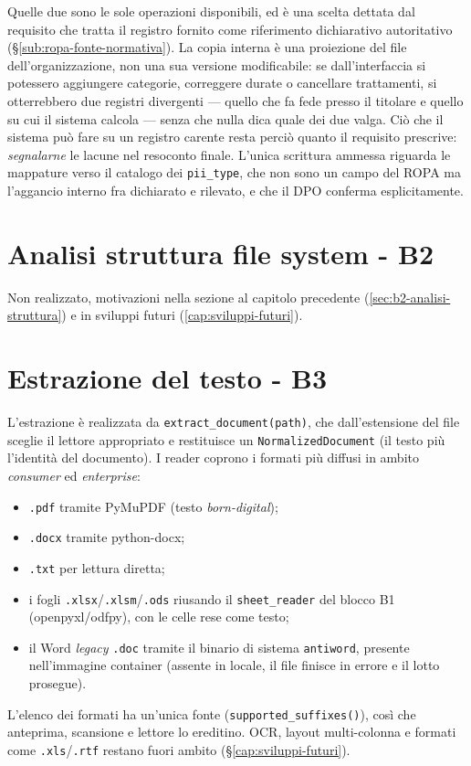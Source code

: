 Quelle due sono le sole operazioni disponibili, ed è una scelta dettata dal requisito che tratta il registro fornito come riferimento dichiarativo autoritativo (§\ref{sub:ropa-fonte-normativa}). La copia interna è una proiezione del file dell'organizzazione, non una sua versione modificabile: se dall'interfaccia si potessero aggiungere categorie, correggere durate o cancellare trattamenti, si otterrebbero due registri divergenti --- quello che fa fede presso il titolare e quello su cui il sistema calcola --- senza che nulla dica quale dei due valga. Ciò che il sistema può fare su un registro carente resta perciò quanto il requisito prescrive: \emph{segnalarne} le lacune nel resoconto finale. L'unica scrittura ammessa riguarda le mappature verso il catalogo dei \texttt{pii\_type}, che non sono un campo del ROPA ma l'aggancio interno fra dichiarato e rilevato, e che il DPO conferma esplicitamente.

\section{Analisi struttura file system - B2}
\label{sec:impl-b2-analisi-fs}
Non realizzato, motivazioni nella sezione al capitolo precedente (\ref{sec:b2-analisi-struttura}) e in sviluppi futuri (\ref{cap:sviluppi-futuri}).

\section{Estrazione del testo - B3}
\label{sec:impl-b3-estrazione}

L'estrazione è realizzata da \texttt{extract\_document(path)}, che dall'estensione del file sceglie il lettore appropriato e restituisce un \texttt{NormalizedDocument} (il testo più l'identità del documento). I reader coprono i formati più diffusi in ambito \emph{consumer} ed \emph{enterprise}:
\begin{itemize}
	\item \texttt{.pdf} tramite PyMuPDF (testo \emph{born-digital});
	\item \texttt{.docx} tramite python-docx;
	\item \texttt{.txt} per lettura diretta;
	\item i fogli \texttt{.xlsx}/\texttt{.xlsm}/\texttt{.ods} riusando il \texttt{sheet\_reader} del blocco B1 (openpyxl/odfpy), con le celle rese come testo;
	\item il Word \emph{legacy} \texttt{.doc} tramite il binario di sistema \texttt{antiword}, presente nell'immagine container (assente in locale, il file finisce in errore e il lotto prosegue).
\end{itemize}
L'elenco dei formati ha un'unica fonte (\texttt{supported\_suffixes()}), così che anteprima, scansione e lettore lo ereditino. OCR, layout multi-colonna e formati come \texttt{.xls}/\texttt{.rtf} restano fuori ambito (§\ref{cap:sviluppi-futuri}).

